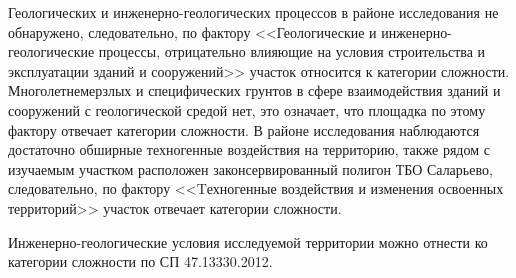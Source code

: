 Геологических и инженерно-геологических процессов 
в районе исследования не обнаружено, следовательно, по фактору 
<<Геологические и инженерно-геологические процессы, отрицательно влияющие на условия строительства и эксплуатации 
зданий и сооружений>> участок относится к  категории сложности. 
Многолетнемерзлых и специфических грунтов в сфере взаимодействия зданий и сооружений с геологической средой
нет, это означает, что площадка по этому фактору отвечает 
 категории сложности. 
В районе исследования наблюдаются достаточно обширные техногенные воздействия на территорию, 
также рядом с изучаемым участком расположен законсервированный 
полигон ТБО Саларьево, следовательно, по фактору 
<<Tехногенные воздействия и изменения освоенных территорий>> участок 
отвечает  категории сложности.

Инженерно-геологические условия исследуемой территории можно отнести ко  категории сложности по СП 47.13330.2012.